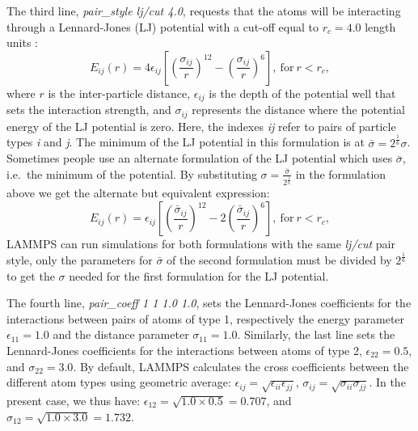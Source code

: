 \documentclass[9pt,tutorial]{livecoms}
\begin{document}
The third line, \textit{pair\_style lj/cut 4.0}, requests that the atoms
will be interacting through a Lennard-Jones (LJ) potential with a
cut-off equal to $r_c = 4.0$ length units
\cite{wang2020lennard,fischer2023history}:
$$E_{ij} (r) = 4 \epsilon_{ij} \left[ \left( \dfrac{\sigma_{ij}}{r} \right)^{12}
  - \left( \dfrac{\sigma_{ij}}{r} \right)^{6} \right], ~ \text{for} ~ r
< r_c,$$ where $r$ is the inter-particle distance, $\epsilon_{ij}$ is
the depth of the potential well that sets the interaction strength, and
$\sigma_{ij}$ represents the distance where the potential energy of the
LJ potential is zero.  Here, the indexes \textit{ij} refer to pairs of
particle types \textit{i} and \textit{j}.  The minimum of the LJ
potential in this formulation is at
$\bar{\sigma} = 2^{\frac{1}{6}}\sigma$.  Sometimes people use an
alternate formulation of the LJ potential which uses $\bar{\sigma}$,
i.e.~the minimum of the potential.  By substituting
$\sigma = \frac{\bar{\sigma}}{2^{\frac{1}{6}}}$ in the formulation above
we get the alternate but equivalent expression:
$$E_{ij} (r) = \epsilon_{ij} \left[ \left( \dfrac{\bar{\sigma}_{ij}}{r} \right)^{12}
  - 2\left( \dfrac{\bar{\sigma}_{ij}}{r} \right)^{6} \right], ~
\text{for} ~ r < r_c,$$ LAMMPS can run simulations for both formulations
with the same \textit{lj/cut} pair style, only the parameters for $\bar{\sigma}$
of the second formulation must be divided by $2^{\frac{1}{6}}$ to get the $\sigma$
needed for the first formulation for the LJ potential.

The fourth line, \textit{pair\_coeff 1 1 1.0 1.0}, sets the
Lennard-Jones coefficients for the interactions between pairs of atoms
of type 1, respectively the energy parameter $\epsilon_{11} = 1.0$ and
the distance parameter $\sigma_{11} = 1.0$.  Similarly, the last line
sets the Lennard-Jones coefficients for the interactions between atoms
of type 2, $\epsilon_{22} = 0.5$, and $\sigma_{22} = 3.0$.  By default,
LAMMPS calculates the cross coefficients between the different atom
types using geometric average:
$\epsilon_{ij} = \sqrt{\epsilon_{ii} \epsilon_{jj}}$,
$\sigma_{ij} = \sqrt{\sigma_{ii} \sigma_{jj}}$.  In the present case, we
thus have: $\epsilon_{12} = \sqrt{1.0 \times 0.5} = 0.707$, and
$\sigma_{12} = \sqrt{1.0 \times 3.0} = 1.732$.
\end{document}
